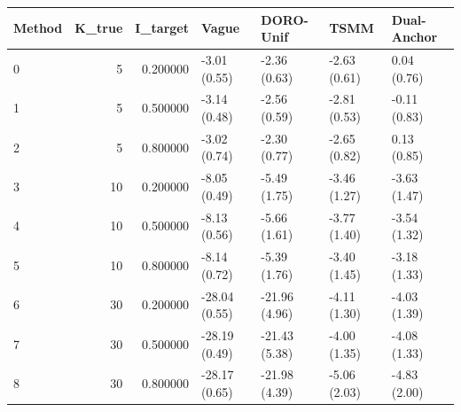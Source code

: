 \begin{tabular}{lrrllll}
\toprule
Method & K_true & I_target & Vague & DORO-Unif & TSMM & Dual-Anchor \\
\midrule
0 & 5 & 0.200000 & -3.01 (0.55) & -2.36 (0.63) & -2.63 (0.61) & 0.04 (0.76) \\
1 & 5 & 0.500000 & -3.14 (0.48) & -2.56 (0.59) & -2.81 (0.53) & -0.11 (0.83) \\
2 & 5 & 0.800000 & -3.02 (0.74) & -2.30 (0.77) & -2.65 (0.82) & 0.13 (0.85) \\
3 & 10 & 0.200000 & -8.05 (0.49) & -5.49 (1.75) & -3.46 (1.27) & -3.63 (1.47) \\
4 & 10 & 0.500000 & -8.13 (0.56) & -5.66 (1.61) & -3.77 (1.40) & -3.54 (1.32) \\
5 & 10 & 0.800000 & -8.14 (0.72) & -5.39 (1.76) & -3.40 (1.45) & -3.18 (1.33) \\
6 & 30 & 0.200000 & -28.04 (0.55) & -21.96 (4.96) & -4.11 (1.30) & -4.03 (1.39) \\
7 & 30 & 0.500000 & -28.19 (0.49) & -21.43 (5.38) & -4.00 (1.35) & -4.08 (1.33) \\
8 & 30 & 0.800000 & -28.17 (0.65) & -21.98 (4.39) & -5.06 (2.03) & -4.83 (2.00) \\
\bottomrule
\end{tabular}

